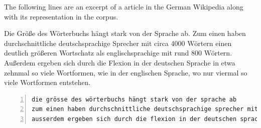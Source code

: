 The following lines are an excerpt of a article in the German Wikipedia along with its representation in the corpus.

\begin{displayquote}
	Die Größe des Wörterbuchs hängt stark von der Sprache ab. Zum einen haben durchschnittliche deutschsprachige Sprecher mit circa 4000 Wörtern einen deutlich größeren Wortschatz als englischsprachige mit rund 800 Wörtern. Außerdem ergeben sich durch die Flexion in der deutschen Sprache in etwa zehnmal so viele Wortformen, wie in der englischen Sprache, wo nur viermal so viele Wortformen entstehen.
\end{displayquote}

\begin{lstlisting}[numbers=left, caption=Representation in corpus]
die grösse des wörterbuchs hängt stark von der sprache ab
zum einen haben durchschnittliche deutschsprachige sprecher mit circa <num> wörtern einen deutlich grösseren wortschatz als englischsprachige mit rund <num> wörtern
ausserdem ergeben sich durch die flexion in der deutschen sprache in etwa zehnmal so viele wortformen wie in der englischen sprache wo nur viermal so viele wortformen entstehen
\end{lstlisting}

